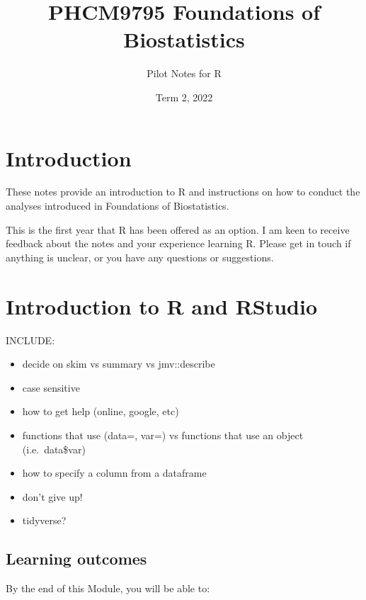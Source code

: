 \documentclass[
]{memoir}
\title{PHCM9795 Foundations of Biostatistics}
\author{Pilot Notes for R}
\date{Term 2, 2022}
\providecommand{\tightlist}{%
  \setlength{\itemsep}{0pt}\setlength{\parskip}{0pt}}
\begin{document}
\maketitle

{
\setcounter{tocdepth}{1}
\tableofcontents
}
\hypertarget{introduction}{%
\chapter*{Introduction}\label{introduction}}

These notes provide an introduction to R and instructions on how to conduct the analyses introduced in Foundations of Biostatistics.

This is the first year that R has been offered as an option. I am keen to receive feedback about the notes and your experience learning R. Please get in touch if anything is unclear, or you have any questions or suggestions.

\hypertarget{introduction-to-r-and-rstudio}{%
\chapter{Introduction to R and RStudio}\label{introduction-to-r-and-rstudio}}

INCLUDE:

\begin{itemize}
\tightlist
\item
  decide on skim vs summary vs jmv::describe
\item
  case sensitive
\item
  how to get help (online, google, etc)
\item
  functions that use (data=, var=) vs functions that use an object (i.e.~data\$var)
\item
  how to specify a column from a dataframe
\item
  don't give up!
\item
  tidyverse?
\end{itemize}

\hypertarget{learning-outcomes}{%
\section*{Learning outcomes}\label{learning-outcomes}}

By the end of this Module, you will be able to:
\end{document}
